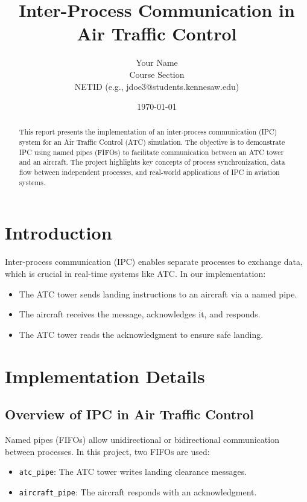 \documentclass[conference]{IEEEtran}
\title{Inter-Process Communication in Air Traffic Control}
\author{Your Name \\ Course Section \\ NETID (e.g., jdoe3@students.kennesaw.edu)}
\date{\today}
\begin{document}
\maketitle

\begin{abstract}
This report presents the implementation of an inter-process communication (IPC) system for an Air Traffic Control (ATC) simulation. The objective is to demonstrate IPC using named pipes (FIFOs) to facilitate communication between an ATC tower and an aircraft. The project highlights key concepts of process synchronization, data flow between independent processes, and real-world applications of IPC in aviation systems.
\end{abstract}

\section{Introduction}
Inter-process communication (IPC) enables separate processes to exchange data, which is crucial in real-time systems like ATC. In our implementation:
\begin{itemize}
    \item The ATC tower sends landing instructions to an aircraft via a named pipe.
    \item The aircraft receives the message, acknowledges it, and responds.
    \item The ATC tower reads the acknowledgment to ensure safe landing.
\end{itemize}

\section{Implementation Details}

\subsection{Overview of IPC in Air Traffic Control}
Named pipes (FIFOs) allow unidirectional or bidirectional communication between processes. In this project, two FIFOs are used:
\begin{itemize}
    \item \texttt{atc\_pipe}: The ATC tower writes landing clearance messages.
    \item \texttt{aircraft\_pipe}: The aircraft responds with an acknowledgment.
\end{itemize}
\end{document}
